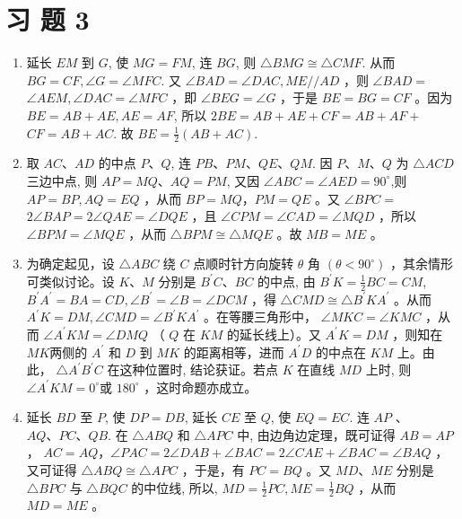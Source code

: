\documentclass[10pt]{article}
\begin{document}
\section*{习 题 3}
\begin{enumerate}
  \item 延长 $E M$ 到 $G$, 使 $M G=F M$, 连 $B G$, 则 $\triangle B M G \cong \triangle C M F$. 从而 $B G=C F, \angle G=\angle M F C$. 又 $\angle B A D=\angle D A C, M E / / A D$ ，则 $\angle B A D=$ $\angle A E M, \angle D A C=\angle M F C$ ，即 $\angle B E G=\angle G$ ，于是 $B E=B G=C F$ 。因为 $B E=A B+A E, A E=A F$, 所以 $2 B E=A B+A E+C F=A B+A F+$ $C F=A B+A C$. 故 $B E=\frac{1}{2}(A B+A C)$.
  \item 取 $A C 、 A D$ 的中点 $P 、 Q$, 连 $P B 、 P M 、 Q E 、 Q M$. 因 $P 、 M 、 Q$ 为 $\triangle A C D$ 三边中点, 则 $A P=M Q 、 A Q=P M$, 又因 $\angle A B C=\angle A E D=90^{\circ}$,则 $A P=B P, A Q=E Q$ ，从而 $B P=M Q ， P M=Q E$ 。又 $\angle B P C=$ $2 \angle B A P=2 \angle Q A E=\angle D Q E$ ，且 $\angle C P M=\angle C A D=\angle M Q D$ ，所以\\
$\angle B P M=\angle M Q E$ ，从而 $\triangle B P M \cong \triangle M Q E$ 。故 $M B=M E$ 。
  \item 为确定起见，设 $\triangle A B C$ 绕 $C$ 点顺时针方向旋转 $\theta$ 角 $\left(\theta<90^{\circ}\right)$ ，其余情形可类似讨论。设 $K 、 M$ 分别是 $B^{\prime} C 、 B C$ 的中点, 由 $B^{\prime} K=\frac{1}{2} B C=C M$, $B^{\prime} A^{\prime}=B A=C D, \angle B^{\prime}=\angle B=\angle D C M$ ，得 $\triangle C M D \cong \triangle B^{\prime} K A^{\prime}$ 。从而 $A^{\prime} K=D M, \angle C M D=\angle B^{\prime} K A^{\prime}$ 。在等腰三角形中， $\angle M K C=\angle K M C$ ，从而 $\angle A^{\prime} K M=\angle D M Q$ （ $Q$ 在 $K M$ 的延长线上）。又 $A^{\prime} K=D M$ ，则知在 $M K$两侧的 $A^{\prime}$ 和 $D$ 到 $M K$ 的距离相等，进而 $A^{\prime} D$ 的中点在 $K M$ 上。由此， $\triangle A^{\prime} B^{\prime} C$ 在这种位置时, 结论获证。若点 $K$ 在直线 $M D$ 上时, 则 $\angle A^{\prime} K M=0^{\circ}$或 $180^{\circ}$ ，这时命题亦成立。
  \item 延长 $B D$ 至 $P$, 使 $D P=D B$, 延长 $C E$ 至 $Q$, 使 $E Q=E C$. 连 $A P$ 、 $A Q 、 P C 、 Q B$. 在 $\triangle A B Q$ 和 $\triangle A P C$ 中, 由边角边定理，既可证得 $A B=A P$ ， $A C=A Q ， \angle P A C=2 \angle D A B+\angle B A C=2 \angle C A E+\angle B A C=\angle B A Q$ ，又可证得 $\triangle A B Q \cong \triangle A P C$ ，于是，有 $P C=B Q$ 。又 $M D 、 M E$ 分别是 $\triangle B P C$ 与 $\triangle B Q C$ 的中位线, 所以, $M D=\frac{1}{2} P C, M E=\frac{1}{2} B Q$ ，从而 $M D=M E$ 。

\end{enumerate}
\end{document}
